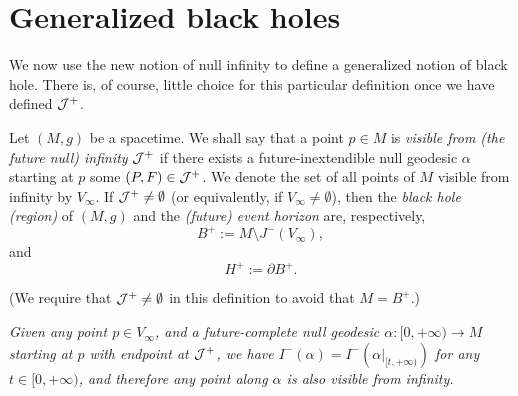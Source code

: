 \section{Generalized black holes}\label{bh2}
We now use the new notion of null infinity to define a generalized notion of black hole. There is, of course, little choice for this particular definition once we have defined ${\cal J}^+$.

\begin{definition}
\label{defbh} Let $(M,g)$ be a spacetime. We shall say that a point $p \in M$ is {\em visible from (the future null)  infinity} ${\cal J}^+$ if there exists a future-inextendible null geodesic $\alpha$ starting at $p$  some $(P,F) \in {\cal J}^+$. We denote the set of all points of $M$ visible from infinity by $V_{\infty}$. If ${\cal J}^+ \neq \emptyset$ (or equivalently, if $V_{\infty} \neq \emptyset$), then the {\em black hole (region)} of $(M,g)$ and the {\em (future) event horizon} are, respectively,
\[
B^+ := M\setminus J^-(V_{\infty}),
\]
and
\[
H^+:= \partial B^+.
\]
\end{definition}
\noindent (We require that ${\cal J}^+ \neq \emptyset$ in this definition to avoid that $M = B^+$.)

\begin{remark}
\label{rmk5}
{\em Given any point $p \in V_{\infty}$, and a future-complete null geodesic $\alpha:[0,+\infty) \rightarrow M$ starting
at $p$ with endpoint at ${\cal J}^+$, we have $I^-(\alpha) = I^-(\alpha|_{[t,+\infty)})$ for any $t \in [0,+\infty)$, and therefore any point along $\alpha$ is also visible from infinity.}
\end{remark}

